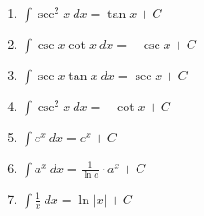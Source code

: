{\begin{minipage}[t]{.6\specialboxlength}
\begin{enumerate}
\item $\int \sec^2 x\ dx = \tan x+C$\myrule
\item $\int \csc x\cot  x\ dx = -\csc x+C$\myrule
\item $\int \sec x\tan x\ dx = \sec x+C$\myrule
\item $\int \csc^2 x\ dx = -\cot x+C$\myrule
\item $\int e^x\ dx = e^x+C$\myrule
\item $\int a^x\ dx = \frac{1}{\ln a}\cdot a^x+C$\myrule
\item $\int \frac{1}x\ dx = \ln |x|+C$\myrule
\end{enumerate}
\end{minipage}%
%
}
%
